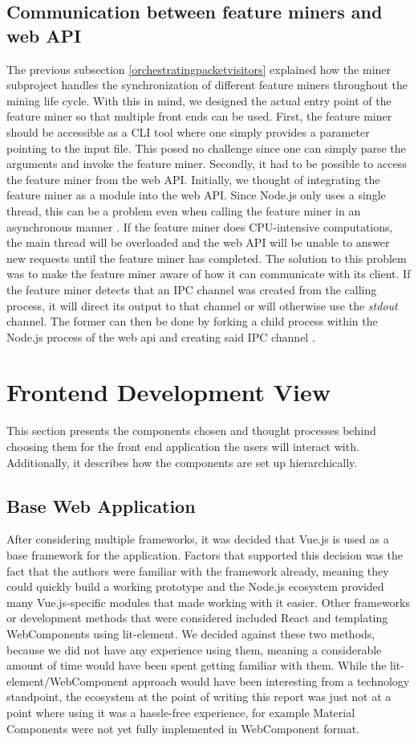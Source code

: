 \subsection{Communication between feature miners and web API}
The previous subsection \ref{orchestratingpacketvisitors} explained how the miner subproject handles the synchronization of different feature miners throughout the mining life cycle. With this in mind, we designed the actual entry point of the feature miner so that multiple front ends can be used. First, the feature miner should be accessible as a CLI tool where one simply provides a parameter pointing to the input file. This posed no challenge since one can simply parse the arguments and invoke the feature miner.
Secondly, it had to be possible to access the feature miner from the web API. Initially, we thought of integrating the feature miner as a module into the web API. Since Node.js only uses a single thread, this can be a problem even when calling the feature miner in an asynchronous manner \cite{nodejs_about}. If the feature miner does CPU-intensive computations, the main thread will be overloaded and the web API will be unable to answer new requests until the feature miner has completed.
The solution to this problem was to make the feature miner aware of how it can communicate with its client. If the feature miner detects that an IPC channel was created from the calling process, it will direct its output to that channel or will otherwise use the \textit{stdout} channel. The former can then be done by forking a child process within the Node.js process of the web api and creating said IPC channel \cite{nodejs_childprocesses}.


 \section{Frontend Development View}
 This section presents the components chosen and thought processes behind choosing them for the front end application the users will interact with. Additionally, it describes how the components are set up hierarchically.
 \subsection{Base Web Application}
 After considering multiple frameworks, it was decided that Vue.js is used as a base framework for the application. Factors that supported this decision was the fact that the authors were familiar with the framework already, meaning they could quickly build a working prototype and the Node.js ecosystem provided many Vue.js-specific modules that made working with it easier. Other frameworks or development methods that were considered included React and templating WebComponents using lit-element. We decided against these two methods, because we did not have any experience using them, meaning a considerable amount of time would have been spent getting familiar with them. While the lit-element/WebComponent approach would have been interesting from a technology standpoint, the ecosystem at the point of writing this report was just not at a point where using it was a hassle-free experience, for example Material Components were not yet fully implemented in WebComponent format.
 
